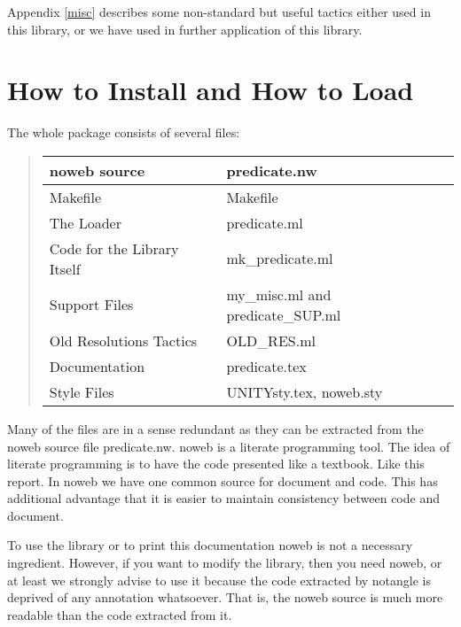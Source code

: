 Appendix \ref{misc} describes some non-standard but useful tactics
either used in this library, or we have used in further application of
this library.





\chapter{How to Install and How to Load}
\label{install}
The whole package consists of several files:

\begin{quote}
\begin{tabular}{|l|l|} \hline
   noweb source & \code{}predicate.nw\edoc{} \\ \hline
   Makefile      & \code{}Makefile\edoc{} \\ \hline
   The Loader &  \code{}predicate.ml\edoc{} \\ \hline
   Code for the Library Itself &  \code{}mk_predicate.ml\edoc{} \\ \hline
   Support Files & \code{}my_misc.ml\edoc{} and 
                           \code{}predicate_SUP.ml\edoc{} \\ \hline
   Old Resolutions Tactics & \code{}OLD_RES.ml\edoc{} \\ \hline
   Documentation &  \code{}predicate.tex\edoc{} \\ \hline
   Style Files    &  \code{}UNITYsty.tex\edoc{}, \code{}noweb.sty\edoc{} \\ \hline
\end{tabular}
\end{quote}

Many of the files are in a sense redundant as they can be extracted
from the \code{}noweb\edoc{} source file \code{}predicate.nw\edoc{}. \code{}noweb\edoc{} is a
literate programming tool. The idea of literate programming is to have
the code presented like a textbook. Like this report. In \code{}noweb\edoc{} we
have one common source for document and code. This has additional
advantage that it is easier to maintain consistency between code and
document.

To use the library or to print this documentation \code{}noweb\edoc{} is not a
necessary ingredient. However, if you want to modify the library, then
you need \code{}noweb\edoc{}, or at least we strongly advise to use it because
the code extracted by \code{}notangle\edoc{} is deprived of any annotation
whatsoever. That is, the \code{}noweb\edoc{} source is much more readable than
the code extracted from it.

